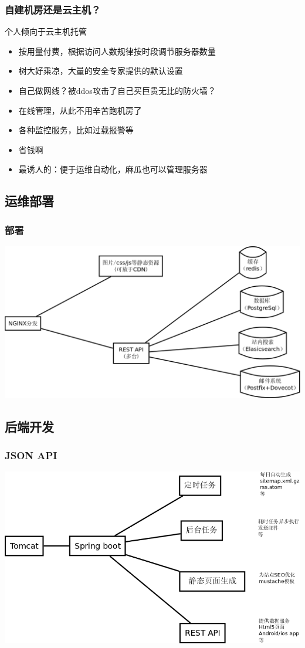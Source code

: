 \documentclass[pdf]{beamer}
\begin{document}
\frame
{
  \frametitle{自建机房还是云主机？}
  个人倾向于云主机托管
  \begin{itemize}
    \item<2-> 按用量付费，根据访问人数规律按时段调节服务器数量
    \item<3-> 树大好乘凉，大量的安全专家提供的默认设置
    \item<4-> 自己做网线？被ddos攻击了自己买巨贵无比的防火墙？
    \item<5-> 在线管理，从此不用辛苦跑机房了
    \item<6-> 各种监控服务，比如过载报警等
    \item<7-> 省钱啊
    \item<8-> 最诱人的：便于运维自动化，麻瓜也可以管理服务器
  \end{itemize}
}


\subsection{运维部署}
\begin{frame}
  \frametitle{部署}
  \begin{center}
	  \includegraphics[width=1.0\textwidth]{1.png}
  \end{center}
\end{frame} 

\subsection{后端开发}
\begin{frame}
  \frametitle{JSON API}
  \begin{center}
	  \includegraphics[width=1.0\textwidth]{2.png}
  \end{center}
\end{frame} 
\end{document}
